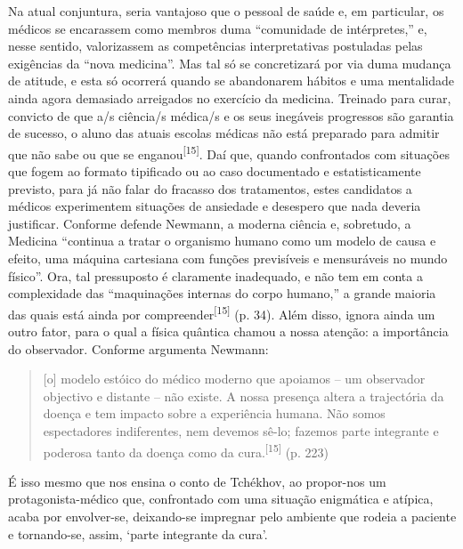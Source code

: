 \documentclass{article}
\begin{document}
Na atual conjuntura, seria vantajoso que o pessoal de saúde e, em particular, os
médicos se encarassem como membros duma “comunidade de intérpretes,” e, nesse
sentido, valorizassem as competências interpretativas postuladas pelas
exigências da “nova medicina”. Mas tal só se concretizará por via duma mudança
de atitude, e esta só ocorrerá quando se abandonarem hábitos e uma mentalidade
ainda agora demasiado arreigados no exercício da medicina. Treinado para curar,
convicto de que a/s ciência/s médica/s e os seus inegáveis progressos são
garantia de sucesso, o aluno das atuais escolas médicas não está preparado para
admitir que não sabe ou que se enganou\textsuperscript{[}\textsuperscript{15}\textsuperscript{]}. Daí que, quando confrontados com situações que fogem ao formato tipificado ou
ao caso documentado e estatisticamente previsto, para já não falar do fracasso
dos tratamentos, estes candidatos a médicos experimentem situações de ansiedade
e desespero que nada deveria justificar. Conforme defende Newmann, a moderna
ciência e, sobretudo, a Medicina “continua a tratar o organismo humano como um
modelo de causa e efeito, uma máquina cartesiana com funções previsíveis e
mensuráveis no mundo físico”. Ora, tal pressuposto é claramente inadequado, e
não tem em conta a complexidade das “maquinações internas do corpo humano,” a
grande maioria das quais está ainda por
compreender\textsuperscript{[}\textsuperscript{15}\textsuperscript{]}
(p. 34). Além disso, ignora ainda um outro fator, para o qual a física quântica
chamou a nossa atenção: a importância do observador. Conforme argumenta Newmann:
\begin{quote}

[o] modelo estóico do médico moderno que apoiamos – um observador objectivo e
distante – não existe. A nossa presença altera a trajectória da doença e tem
impacto sobre a experiência humana. Não somos espectadores indiferentes, nem
devemos sê-lo; fazemos parte integrante e poderosa tanto da doença como da
cura.\textsuperscript{[}\textsuperscript{15}\textsuperscript{]}
(p. 223)

\end{quote}

É isso mesmo que nos ensina o conto de Tchékhov, ao propor-nos um
protagonista-médico que, confrontado com uma situação enigmática e atípica,
acaba por envolver-se, deixando-se impregnar pelo ambiente que rodeia a paciente
e tornando-se, assim, ‘parte integrante da cura’.
\end{document}
